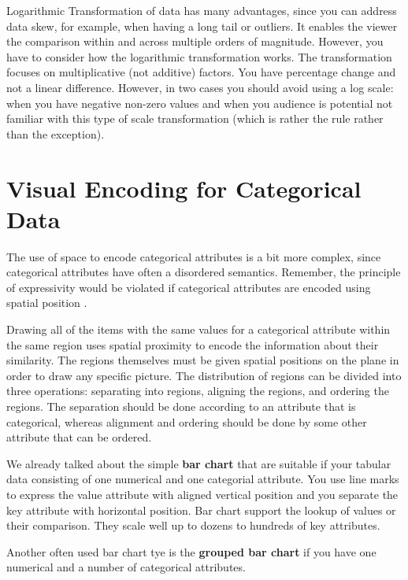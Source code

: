 \documentclass[
]{book}
\begin{document}
Logarithmic Transformation of data has many advantages, since you can address data skew, for example, when having a long tail or outliers. It enables the viewer the comparison within and across multiple orders of magnitude. However, you have to consider how the logarithmic transformation works. The transformation focuses on multiplicative (not additive) factors. You have percentage change and not a linear difference. However, in two cases you should avoid using a log scale: when you have negative non-zero values and when you audience is potential not familiar with this type of scale transformation (which is rather the rule rather than the exception).

\hypertarget{Visual-Encoding-for-Categorical-Data}{%
\section{Visual Encoding for Categorical Data}\label{Visual-Encoding-for-Categorical-Data}}

The use of space to encode categorical attributes is a bit more complex, since categorical attributes have often a disordered semantics. Remember, the principle of expressivity would be violated if categorical attributes are encoded using spatial position \citep{munzner2014visualization}.

Drawing all of the items with the same values for a categorical attribute within the same region uses spatial proximity to encode the information about their similarity. The regions themselves must be given spatial positions on the plane in order to draw any specific picture. The distribution of regions can be divided into three operations: separating into regions, aligning the regions, and ordering the regions. The separation should be done according to an attribute that is categorical, whereas alignment and ordering should be done by some other attribute that can be ordered.

We already talked about the simple \textbf{bar chart} that are suitable if your tabular data consisting of one numerical and one categorial attribute. You use line marks to express the value attribute with aligned vertical position and you separate the key attribute with horizontal position. Bar chart support the lookup of values or their comparison. They scale well up to dozens to hundreds of key attributes.

Another often used bar chart tye is the \textbf{grouped bar chart} if you have one numerical and a number of categorical attributes.
\end{document}
